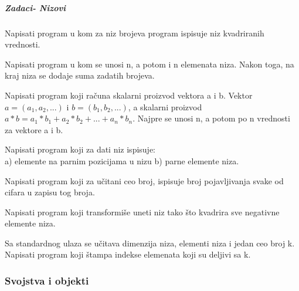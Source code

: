 \subparagraph{Zadaci- Nizovi}

\begin{primer}
Napisati program u kom za niz brojeva program ispisuje niz kvadriranih vrednosti.
\end{primer}

\begin{primer}
Napisati program u kom se unosi n, a potom i n elemenata niza. Nakon toga, na kraj niza se dodaje suma zadatih brojeva.
\end{primer}

\begin{primer}
Napisati program koji računa skalarni proizvod vektora a i b. Vektor $a=(a_1, a_2,...)$ i $b=(b_1, b_2,...)$, a skalarni proizvod $a*b= a_1 * b_1 + a_2 * b_2 + ... + a_n * b_n$. Najpre se unosi n, a potom po n vrednosti za vektore a i b. 
\end{primer}

\begin{primer}
Napisati program koji za dati niz ispisuje:\\
a) elemente na parnim pozicijama u nizu
b) parne elemente niza.
\end{primer}

\begin{primer}
Napisati program koji za učitani ceo broj, ispisuje broj
pojavljivanja svake od cifara u zapisu tog broja.
\end{primer}


\begin{primer}
Napisati program koji transformiše uneti niz tako što
kvadrira sve negativne elemente niza. 
\end{primer}

\begin{primer}
Sa standardnog ulaza se učitava dimenzija niza, elementi
niza i jedan ceo broj k. Napisati program koji štampa indekse elemenata koji su
deljivi sa k.
\end{primer}
\newpage

\subsubsection{Svojstva i objekti}

